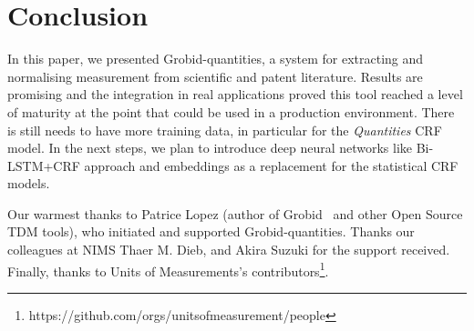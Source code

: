 \documentclass[sigconf]{acmart}
\begin{document}
\section{Conclusion}
\label{sec:conclusion}
In this paper, we presented Grobid-quantities, a system for extracting and normalising measurement from scientific and patent literature. Results are promising and the integration in real applications proved this tool reached a level of maturity at the point that could be used in a production environment. There is still needs to have more training data, in particular for the \textit{Quantities} CRF model. In the next steps, we plan to introduce deep neural networks like Bi-LSTM+CRF approach and embeddings as a replacement for the statistical CRF models. 

\begin{acks}
Our warmest thanks to Patrice Lopez (author of Grobid~\cite{GROBID} and other Open Source TDM tools), who initiated and supported Grobid-quantities. Thanks our colleagues at NIMS Thaer M. Dieb, and Akira Suzuki for the support received. Finally, thanks to Units of Measurements's contributors\footnote{https://github.com/orgs/unitsofmeasurement/people}.
\end{acks}




\end{document}
